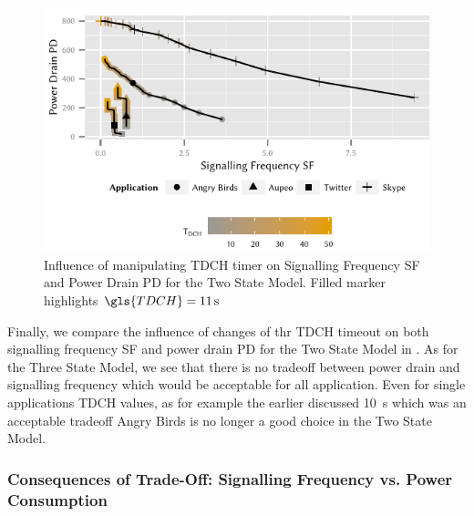 \begin{figure}
	\centering
	\includegraphics{network/network_traces/numerical_results/figures/2_state_signalling_vs_power_consumption}
	\caption{Influence of manipulating \gls{TDCH} timer on Signalling Frequency \gls{SF} and Power Drain \gls{PD} for the Two State Model. Filled marker highlights \(\gls{TDCH} = \SI{11}{\second}\)}\label{fig:network:network_traces:numerical_results:two_states:trade_off}
\end{figure}
Finally, we compare the influence of changes of thr \gls{TDCH} timeout on both signalling frequency \gls{SF} and power drain \gls{PD} for the Two State Model in .
As for the Three State Model, we see that there is no tradeoff between power drain and signalling frequency which would be acceptable for all application.
Even for single applications \gls{TDCH} values, as for example the earlier discussed \SI{10}{\second} which was an acceptable tradeoff Angry Birds is no longer a good choice in the Two State Model.

\subsubsection*{Consequences of Trade-Off: Signalling Frequency vs. Power Consumption}\label{sec:network:network_traces:numerical_results:trade_off}

